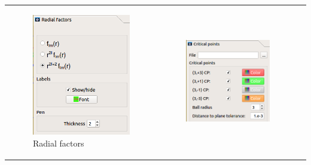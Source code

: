 \documentclass[10pt]{article}
\begin{document}
\begin{tabular}{lcr}
\begin{minipage}{.3\linewidth}
\begin{figure}[H]
    \begin{center}
        \includegraphics[width=.6\linewidth]{damqt_fig_3_6.png}
    \end{center}
    \caption{Radial factors \label{fig:3_6}}
\end{figure}
\end{minipage}
&
\begin{minipage}{.3\linewidth}
\begin{figure}[H]
    \begin{center}
        \includegraphics[width=.74\linewidth]{damqt_fig_3_7.png}

\end{center}
\end{figure}
\end{minipage}
\end{tabular}
\end{document}
